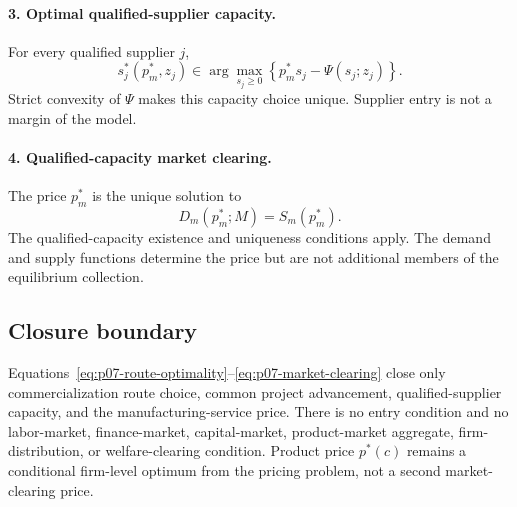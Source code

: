 \paragraph{3. Optimal qualified-supplier capacity.}
For every qualified supplier \(j\),
\begin{equation}
  s_j^*(p_m^*,z_j)
  \in
  \arg\max_{s_j\geq0}
  \left\{
    p_m^*s_j-\Psi(s_j;z_j)
  \right\}.
  \label{eq:p07-capacity-optimality}
\end{equation}
Strict convexity of \(\Psi\) makes this capacity choice unique. Supplier entry
is not a margin of the model.

\paragraph{4. Qualified-capacity market clearing.}
The price \(p_m^*\) is the unique solution to
\begin{equation}
  D_m(p_m^*;M)=S_m(p_m^*).
  \label{eq:p07-market-clearing}
\end{equation}
The qualified-capacity existence and uniqueness conditions apply. The demand and supply
functions determine the price but are not additional members of the
equilibrium collection.

\subsection{Closure boundary}
\label{subsec:p07-closure-boundary}

Equations~\eqref{eq:p07-route-optimality}--\eqref{eq:p07-market-clearing}
close only commercialization route choice, common project advancement,
qualified-supplier capacity, and the manufacturing-service price. There is no
entry condition and no labor-market, finance-market, capital-market,
product-market aggregate,
firm-distribution, or welfare-clearing condition. Product price \(p^*(c)\)
remains a conditional firm-level optimum from the pricing problem, not a second
market-clearing price.
